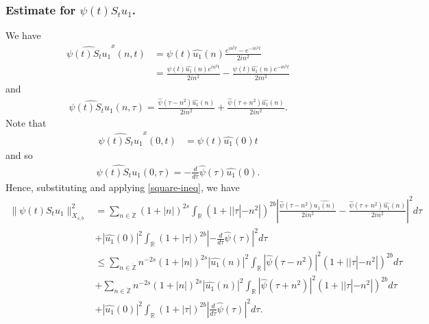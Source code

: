 \documentclass[12pt,reqno]{amsart}
\numberwithin{equation}{section}  %
\numberwithin{figure}{section}
\newcommand{\rr}{\mathbb{R}}
\newcommand{\zz}{\mathbb{Z}}
\newcommand{\zzdot}{\dot{\zz}}
\newcommand{\wh}{\widehat}
\theoremstyle{plain}
\theoremstyle{definition}
\theoremstyle{remark}
\begin{document}
\subsubsection{Estimate for $\psi(t) S_{t}u_{1}$.}
\label{sssec:estimate-init-term-2}
We have
%
%
\begin{equation*}
  \begin{split}
    \wh{\psi(t)S_{t}u_{1}}^{x}(n, t)
    & = \psi(t) \wh{u_{1}}(n) \frac{e^{in^2 t} - e^{-in^{2}t}}{2i n^{2}}
    \\
    & = \frac{\psi(t) \wh{u_{1}}(n)e^{in^{2}t}}{2i n^{2}} - \frac{\psi(t)
    \wh{u_{1}}(n)e^{-in^{2}t}}{2i n^{2}}  
  \end{split}
\end{equation*}
%
%
and
%
%
\begin{equation*}
  \begin{split}
    \wh{\psi(t) S_{t}u_{1}}(n, \tau) = \frac{\wh{\psi}(\tau -
    n^{2})\wh{u_{1}}(n)}{2i n^{2}} + \frac{\wh{\psi}(\tau + n^{2})\wh{u_{1}}(n)}{2i
    n^{2}}.
  \end{split}
\end{equation*}
%
Note that 
%
\begin{equation*}
  \begin{split}
    \wh{\psi(t)S_{t}u_{1}}^{x}(0, t)
    & = \psi(t) \wh{u_{1}}(0) t
      \end{split}
\end{equation*}
and so 
%
%
\begin{equation*}
  \begin{split}
    \wh{\psi(t) S_{t}u_{1}}(0, \tau) = -\frac{d}{d \tau} \wh{\psi}(\tau)
    \wh{u_{1}}(0).
  \end{split}
\end{equation*}
%
Hence, substituting and applying \eqref{square-ineq}, we have
%
%
\begin{equation}
  \begin{split}
    \| \psi(t) S_{t}u_{1} \|_{X_{s,b}}^{2} 
    & = \sum_{n \in \zzdot}(1 + |n|)^{2s} \int_{\rr}\left( 1 + | | \tau
    |-n^{2} | \right)^{2b} | \frac{\wh{\psi}(\tau - n^{2})\wh{u_{1}(n)}}{2i
    n^{2}} -
    \frac{\wh{\psi}(\tau + n^{2})\wh{u_{1}}(n)}{2i n^{2}} |^{2} d \tau
    \\
    & + |\wh{u_{1}}(0)|^{2} \int_{\rr} (1 + | \tau |)^{2b} | - \frac{d }{d \tau}
    \wh{\psi}(\tau)|^{2} d \tau
    \\
    & \le \sum_{n \in \dot{\zz}} n^{-2s} \left( 1 + |n| \right)^{2s} | \wh{u_{1}}(n)
    |^{2} \int_{\rr} | \wh{\psi}(\tau - n^{2}) |^{2}\left( 1 + | | \tau | -
    n^{2} | \right)^{2b} d \tau
    \\
    & + \sum_{n \in \dot{\zz}} n^{-2s} \left( 1 + |n| \right)^{2s} | \wh{u_{1}}(n)
    |^{2} \int_{\rr} | \wh{\psi}(\tau + n^{2}) |^{2}\left( 1 + | | \tau | -
    n^{2} | \right)^{2b} d \tau
    \\
    & + |\wh{u_{1}}(0)|^{2} \int_{\rr} (1 + | \tau |)^{2b} |\frac{d }{d \tau}
    \wh{\psi}(\tau)|^2 d \tau.
\end{split}
\label{u-1-norm-comp-pre}
\end{equation}
\end{document}
